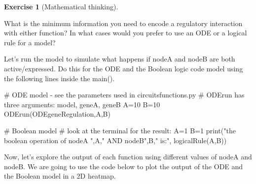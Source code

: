 \documentclass[
  letterpaper,
  DIV=11,
  numbers=noendperiod]{scrreprt}
\newenvironment{Shaded}{\begin{snugshade}}{\end{snugshade}}
\newcommand{\BuiltInTok}[1]{\textcolor[rgb]{0.00,0.23,0.31}{#1}}
\newcommand{\CommentTok}[1]{\textcolor[rgb]{0.37,0.37,0.37}{#1}}
\newcommand{\DecValTok}[1]{\textcolor[rgb]{0.68,0.00,0.00}{#1}}
\newcommand{\NormalTok}[1]{\textcolor[rgb]{0.00,0.23,0.31}{#1}}
\newcommand{\OperatorTok}[1]{\textcolor[rgb]{0.37,0.37,0.37}{#1}}
\newcommand{\StringTok}[1]{\textcolor[rgb]{0.13,0.47,0.30}{#1}}
\theoremstyle{definition}
\newtheorem{exercise}{Exercise}[chapter]
\theoremstyle{remark}
\begin{document}
\begin{exercise}[Mathematical
thinking]\protect\hypertarget{exr-non}{}\label{exr-non}

What is the minimum information you need to encode a regulatory
interaction with either function? In what cases would you prefer to use
an ODE or a logical rule for a model?

\end{exercise}

Let's run the model to simulate what happens if nodeA and nodeB are both
active/expressed. Do this for the ODE and the Boolean logic code model
using the following lines inside the main().

\begin{Shaded}
\begin{Highlighting}[]
\CommentTok{\# ODE model {-} see the parameters used in circuitsfunctions.py}
\CommentTok{\# ODErun has three arguments: model, geneA, geneB}
\NormalTok{A}\OperatorTok{=}\DecValTok{10}
\NormalTok{B}\OperatorTok{=}\DecValTok{10}
\NormalTok{ODErun(ODEgeneRegulation,A,B) }

\CommentTok{\# Boolean model}
\CommentTok{\# look at the terminal for the result:}
\NormalTok{A}\OperatorTok{=}\DecValTok{1}
\NormalTok{B}\OperatorTok{=}\DecValTok{1}
\BuiltInTok{print}\NormalTok{(}\StringTok{"the boolean operation of nodeA "}\NormalTok{,A,}\StringTok{" AND nodeB"}\NormalTok{,B,}\StringTok{" is:"}\NormalTok{, logicalRule(A,B))}
\end{Highlighting}
\end{Shaded}

Now, let's explore the output of each function using different values of
nodeA and nodeB. We are going to use the code below to plot the output
of the ODE and the Boolean model in a 2D heatmap.
\end{document}
